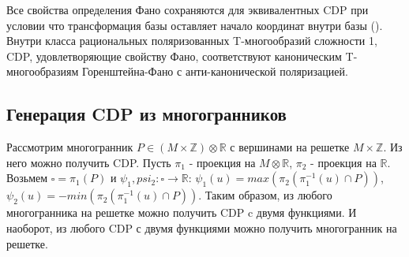 \documentclass[fontsize=14pt]{scrartcl}
\theoremstyle{definition}
\begin{document}
Все свойства определения Фано сохраняются для эквивалентных CDP при условии что трансформация базы оставляет начало координат внутри базы (\cite{main}).
Внутри класса рациональных поляризованных T-многообразий сложности 1, CDP, удовлетворяющие свойству Фано, соответствуют каноническим T-многообразиям Горенштейна-Фано с анти-канонической поляризацией.
\subsection{Генерация CDP из многогранников}
Рассмотрим многогранник $P \in (M \times \mathds{Z}) \otimes \mathds{R}$ с вершинами на решетке $M \times \mathds{Z}$. Из него можно получить CDP. Пусть $\pi_1$ - проекция на $M \otimes \mathds{R}$, $\pi_2$ - проекция на $\mathds{R}$. Возьмем $\square = \pi_1(P)$ и $\psi_1, psi_2: \square \rightarrow \mathds{R}$: 
$ \psi_1(u) = max(\pi_2(\pi_1^{-1}(u) \cap P))$, $\psi_2(u) = -min(\pi_2(\pi_1^{-1}(u) \cap P))$. Таким образом, из любого многогранника на решетке можно получить CDP c двумя функциями. И наоборот, из любого CDP с двумя функциями можно получить многогранник на решетке.
\end{document}

